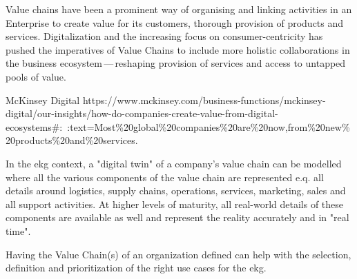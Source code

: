 %
%

Value chains have been a prominent way of organising and linking activities in an Enterprise to create value
for its customers, thorough provision of products and services.
Digitalization and the increasing focus on consumer-centricity
has pushed the imperatives of Value Chains to include more holistic collaborations in the
business ecosystem\,---\,reshaping provision of services and access to untapped pools of value.

{McKinsey Digital}
{https://www.mckinsey.com/business-functions/mckinsey-digital/our-insights/how-do-companies-create-value-from-digital-ecosystems\#:~:text=Most\%20global\%20companies\%20are\%20now,from\%20new\%20products\%20and\%20services.}

\ekgmmContextSection

\ekgmmHowEKGAffectsThisCapability

In the \gls{ekg} context, a "digital twin" of a company's value chain can be modelled
where all the various components of the value chain are represented e.q. all details around logistics,
supply chains, operations, services, marketing, sales and all support activities.
At higher levels of maturity, all real-world details of these components are available as well and represent
the reality accurately and in "real time".

\ekgmmHowEKGRequiresThisCapability

Having the Value Chain(s) of an organization defined can help with the selection, definition and prioritization of
the right use cases for the \gls{ekg}.

